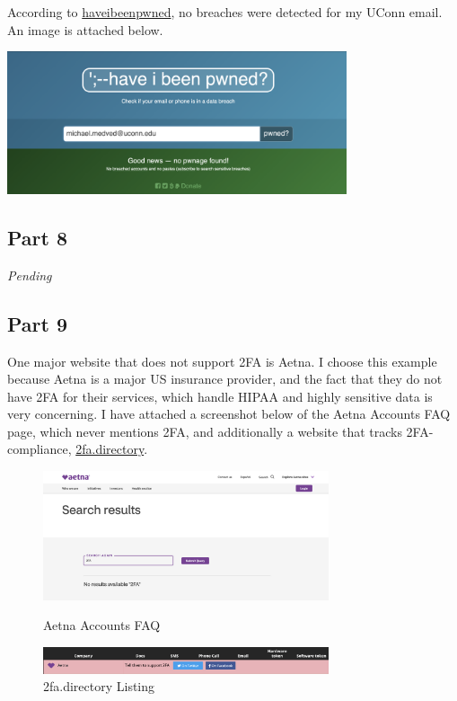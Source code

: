 \documentclass{article}
\begin{document}
According to \href{https://haveibeenpwned.com}{haveibeenpwned}, no breaches were detected for my UConn email. An image is attached below.

\begin{center}
    \includegraphics[width=0.75\textwidth]{q7.png}
\end{center}

\subsection{Part 8}

\textit{Pending}

\newpage
\subsection{Part 9}

One major website that does not support 2FA is Aetna. I choose this example because Aetna is a major US insurance provider, and the fact that they do not have 2FA for their services, which handle HIPAA and highly sensitive data is very concerning. I have attached a screenshot below of the Aetna Accounts FAQ page, which never mentions 2FA, and additionally a website that tracks 2FA-compliance, \href{https://2fa.directory}{2fa.directory}.

\begin{figure}[!htb]
    \centering
    \includegraphics[width=0.75\textwidth]{q9a1.png}
    \caption{Aetna Accounts FAQ}
    \label{fig:q9}

    \vspace{0.2in}

    \includegraphics[width=0.75\textwidth]{q9a2.png}
    \caption{2fa.directory Listing}
    \label{fig:q9-2}
\end{figure}
\end{document}
